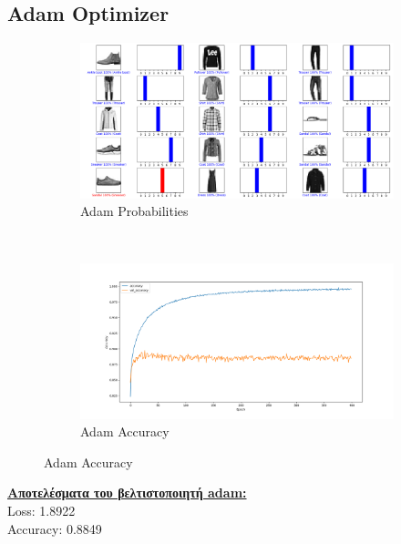 \documentclass{article}
\begin{document}
\subsection*{Adam Optimizer}
	\begin{figure}[h!]
		\centering
		\begin{subfigure}[t]{0.5\textwidth}
			\centering
			\includegraphics[width=\linewidth]{../exercise3_3/images/fashion_adam_probabilities.png}
			\caption{Adam Probabilities}
		\end{subfigure}%
		~
		\begin{subfigure}[t]{0.5\textwidth}
			\centering
			\includegraphics[width=\linewidth]{../exercise3_3/images/fashion_adam_accuracy.png}
			\caption{Adam Accuracy}
		\end{subfigure}
	\end{figure}
	\noindent
	\textbf{\underline{Aποτελέσματα του βελτιστοποιητή adam:}}\\
	Loss: 1.8922 \\
	Accuracy: 0.8849
	
\pagebreak
\end{document}
